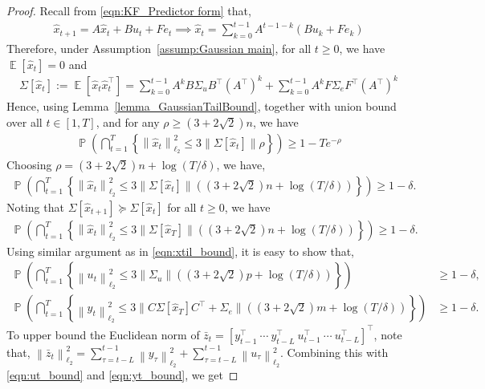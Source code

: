 \documentclass[11pt]{article}
\newcommand{\zbar}{\bar{z}}
\newcommand{\xtil}{\hat{x}}
\newcommand{\tn}[1]{\left\|{#1}\right\|_{\ell_2}}
\newcommand{\E}{\operatorname{\mathbb{E}}}
\renewcommand{\P}{\operatorname{\mathbb{P}}}
\newcommand{\norm}[1]{\|{#1} \|}
\newcommand{\T}{\top}
\newcommand{\<}{\langle}
\renewcommand{\>}{\rangle}
\renewcommand{\P}{\operatorname{\mathbb{P}}}
\numberwithin{equation}{section}
\begin{document}
\begin{proof}
Recall from \eqref{eqn:KF_Predictor form} that,
    \begin{align}
        \xtil_{t+1} = A \xtil_t + B u_t + F e_t \implies \xtil_t = \sum_{k=0}^{t-1} A^{t-1-k} (B u_k + F e_k)
    \end{align}
Therefore, under Assumption~\ref{assump:Gaussian main}, for all $t\geq 0$, we have $\E[\xtil_t] = 0$ and
\begin{align}
    \Sigma[\xtil_t] := \E\left[\xtil_t \xtil_t^\T\right] = \sum_{k=0}^{t-1} A^k B \Sigma_u B^\T (A^\T)^k + \sum_{k=0}^{t-1} A^k F \Sigma_e F^\T (A^\T)^k
\end{align}
Hence, using Lemma~\ref{lemma_GaussianTailBound}, together with union bound over all $t \in [1,T]$, and for any $\rho \geq (3+ 2\sqrt{2}) n$, we have
\begin{align}
    \P\left(\bigcap_{t=1}^T\left\{\tn{\xtil_t}^2 \leq 3 \norm{\Sigma[\xtil_t]} \rho\right\}\right) \geq 1 - T e^{-\rho}
\end{align}
Choosing $\rho = (3+ 2\sqrt{2}) n + \log (T/\delta)$, we have,
\begin{align}
    \P\left(\bigcap_{t=1}^T\left\{\tn{\xtil_t}^2 \leq 3 \norm{\Sigma[\xtil_t]} \left( (3+ 2\sqrt{2}) n + \log (T/\delta)\right)\right\}\right) \geq 1 - \delta.
\end{align}
Noting that $\Sigma[\xtil_{t+1}] \succeq \Sigma[\xtil_{t}]$ for all $t \geq 0$, we have
\begin{align}
    \P\left(\bigcap_{t=1}^T\left\{\tn{\xtil_t}^2 \leq 3 \norm{\Sigma[\xtil_T]} \left( (3+ 2\sqrt{2}) n + \log (T/\delta)\right)\right\}\right) \geq 1 - \delta. \label{eqn:xtil_bound}
\end{align}
Using similar argument as in \eqref{eqn:xtil_bound}, it is easy to show that,
\begin{align}
    \P\left(\bigcap_{t=1}^T\left\{\tn{u_t}^2 \leq 3 \norm{\Sigma_u} \left( (3+ 2\sqrt{2}) p + \log (T/\delta)\right)\right\}\right) &\geq 1 - \delta, \label{eqn:ut_bound} \\
    \P\left(\bigcap_{t=1}^T\left\{\tn{y_t}^2 \leq 3 \norm{C\Sigma[\xtil_T]C^\T + \Sigma_e} \left( (3+ 2\sqrt{2}) m + \log (T/\delta)\right)\right\}\right) &\geq 1 - \delta. \label{eqn:yt_bound}
\end{align}
To upper bound the Euclidean norm of $\zbar_t =  [y_{t-1}^\T~\cdots~y_{t-L}^\T~u_{t-1}^\T~\cdots~u_{t-L}^\T]^\T$, note that, $\tn{\zbar_t}^2 = \sum_{\tau=t-L}^{t-1} \tn{y_\tau}^2 + \sum_{\tau=t-L}^{t-1} \tn{u_\tau}^2$. Combining this with \eqref{eqn:ut_bound} and \eqref{eqn:yt_bound}, we get

\end{proof}
\end{document}
